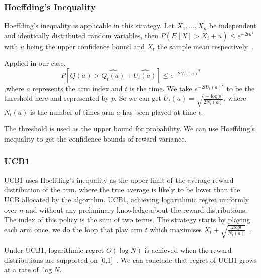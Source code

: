 \subsubsection{Hoeffding’s Inequality}
Hoeffding's inequality is applicable in this strategy.
Let $X_1, \dots, X_n$ be independent and identically distributed random variables, then $ P(E[X] > \overline  X_t + u) \leq e^{-2t u^2}$ with $u$ being the upper confidence bound and $ \overline X_t $ the sample mean respectively~\citep{Hoeffding1963}.
\par
Applied in our case,
\[P[Q(a) >\widehat{Q_t (a)}+\widehat{U_t (a)}] \leq e^{-2t U_t(a)^2}\]
,where $a$ represents the arm index and $t$ is the time.
We take $e^{-2t U_t(a)^2} $ to be the threshold here and represented by $p$.
So we can get $U_t(a) = \sqrt{\frac{-\log p}{2N_t (a)}}$, where $N_t (a)$ is the number of times arm $a$ has been played at time $t$.
\par
The threshold is used as the upper bound for probability.
We can use Hoeffding's inequality to get the confidence bounds of reward variance.

\subsubsection{UCB1}
UCB1 uses Hoeffding's inequality as the upper limit of the average reward distribution of the arm, where the true average is likely to be lower than the UCB allocated by the algorithm.
UCB1, achieving logarithmic regret uniformly over $n$ and without any preliminary knowledge about the reward distributions.
The index of this policy is the sum of two terms.
The strategy starts by playing each arm once, we do the loop that play arm $t$ which maximises $\overline X_t + \sqrt{\frac{2log t}{N_t (a)}}$~\citep{Auer2002}.
\par
Under UCB1, logarithmic regret $O(\log N)$  is achieved when the reward distributions are supported on [0,1]~\citep{Chan_2020}.
We can conclude that regret of UCB1 grows at a rate of $\log N$.
\par

